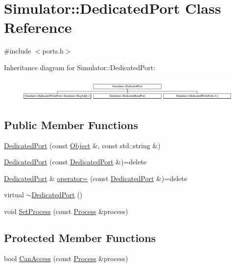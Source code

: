 \hypertarget{class_simulator_1_1_dedicated_port}{\section{Simulator\+:\+:Dedicated\+Port Class Reference}
\label{class_simulator_1_1_dedicated_port}
}


{\ttfamily \#include $<$ports.\+h$>$}

Inheritance diagram for Simulator\+:\+:Dedicated\+Port\+:\begin{figure}[H]
\begin{center}
\leavevmode
\includegraphics[height=1.170324cm]{class_simulator_1_1_dedicated_port}
\end{center}
\end{figure}
\subsection*{Public Member Functions}
\begin{DoxyCompactItemize}
\item 
\hyperlink{class_simulator_1_1_dedicated_port_a76e065440e802a0be0272dd3f6c29dba}{Dedicated\+Port} (const \hyperlink{class_simulator_1_1_object}{Object} \&, const std\+::string \&)
\item 
\hyperlink{class_simulator_1_1_dedicated_port_a12bfc8a6c4dab2a12de69d056d9e668a}{Dedicated\+Port} (const \hyperlink{class_simulator_1_1_dedicated_port}{Dedicated\+Port} \&)=delete
\item 
\hyperlink{class_simulator_1_1_dedicated_port}{Dedicated\+Port} \& \hyperlink{class_simulator_1_1_dedicated_port_a7e0cf4bca02a6549ce0fbaaf78eed234}{operator=} (const \hyperlink{class_simulator_1_1_dedicated_port}{Dedicated\+Port} \&)=delete
\item 
virtual \hyperlink{class_simulator_1_1_dedicated_port_a0b6194c6742667123c16dee0f68dcf62}{$\sim$\+Dedicated\+Port} ()
\item 
void \hyperlink{class_simulator_1_1_dedicated_port_a1538e25c8b0cfe66e690f185ab2bb630}{Set\+Process} (const \hyperlink{class_simulator_1_1_process}{Process} \&process)
\end{DoxyCompactItemize}
\subsection*{Protected Member Functions}
\begin{DoxyCompactItemize}
\item 
bool \hyperlink{class_simulator_1_1_dedicated_port_a66706a589cd6b63477c5299eca65b494}{Can\+Access} (const \hyperlink{class_simulator_1_1_process}{Process} \&process)
\end{DoxyCompactItemize}


